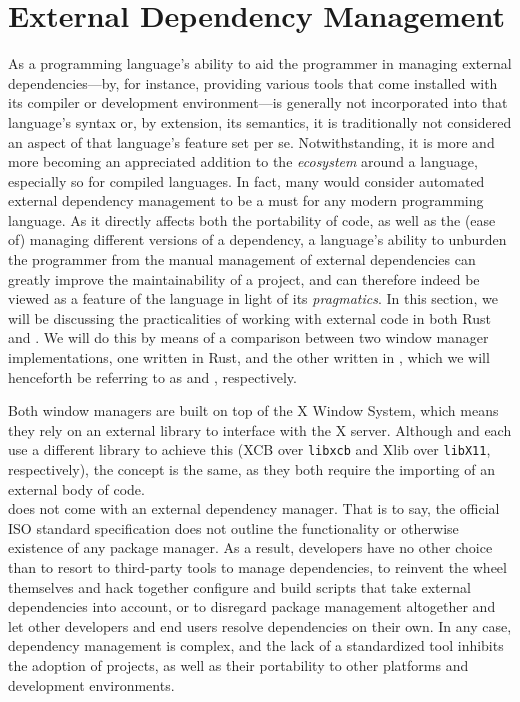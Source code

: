 \section{External Dependency Management}

As a programming  language's ability to aid the programmer  in managing external
dependencies---by,  for instance,  providing various  tools that  come installed
with  its compiler  or development  environment---is generally  not incorporated
into that language's syntax or, by extension, its semantics, it is traditionally
not considered an aspect of that language's feature set per se. Notwithstanding,
it is more  and more becoming an appreciated addition  to the \textit{ecosystem}
around a  language, especially so  for compiled  languages. In fact,  many would
consider automated  external dependency management to  be a must for  any modern
programming language.  As it directly affects  both the portability of  code, as
well as the (ease of) managing  different versions of a dependency, a language's
ability  to unburden  the  programmer  from the  manual  management of  external
dependencies  can greatly  improve the  maintainability  of a  project, and  can
therefore  indeed be  viewed  as a  feature  of  the language  in  light of  its
\textit{pragmatics}. In this  section, we will be  discussing the practicalities
of working with external code in both Rust and \cpp. We will do this by means of
a comparison  between two window  manager implementations, one written  in Rust,
and the other written in \cpp, which we will henceforth be referring to as \wmrs
and \wmcpp, respectively.

Both window managers are  built on top of the X Window  System, which means they
rely on an external  library to interface with the X  server. Although \wmrs and
\wmcpp each  use a different library  to achieve this (XCB  over \texttt{libxcb}
and Xlib over  \texttt{libX11}, respectively), the concept is the  same, as they
both require the importing of an external body of code.\\

\cpp does  not come  with an external  dependency manager. That  is to  say, the
official  ISO  standard \cpp  specification\cite{cppstd}  does  not outline  the
functionality  or otherwise  existence  of  any package  manager.  As a  result,
developers have  no other choice than  to resort to third-party  tools to manage
dependencies, to reinvent  the wheel themselves and hack  together configure and
build  scripts that  take external  dependencies into  account, or  to disregard
package management  altogether and  let other developers  and end  users resolve
dependencies on their  own. In any case, \cpp dependency  management is complex,
and the lack of  a standardized tool inhibits the adoption  of \cpp projects, as
well as their portability to other platforms and development environments.

